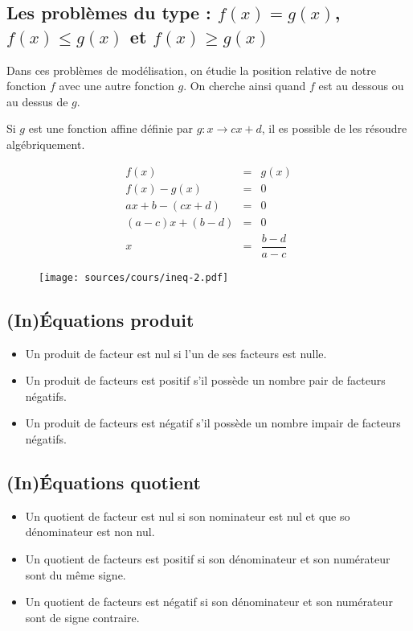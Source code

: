 \documentclass[paper=a4, fontsize=9pt]{scrartcl} %
\begin{document}
\subsection{Les problèmes du type : $f(x) = g(x)$, $f(x) \leq g(x)$ et $f(x) \geq g(x)$}

\begin{multicols}{2}

  Dans ces problèmes de modélisation, on étudie la position relative de notre fonction $f$ avec une autre fonction $g$. On cherche ainsi quand $f$ est au dessous ou au dessus de $g$.

  Si $g$ est une fonction affine définie par $ g : x \to cx + d$, il es possible de les résoudre algébriquement.


  \begin{eqnarray*}
    f(x) & = & g(x)\\
    f(x) - g(x) & = & 0\\
    ax + b - (cx + d) & = & 0\\
    (a - c) x + (b - d) &=& 0\\
    x &=& \dfrac{b-d}{a-c}
  \end{eqnarray*}

  \begin{figure}[H]
    \centering
    \texttt{[image: sources/cours/ineq-2.pdf]}
  \end{figure}

\end{multicols}

\subsection{(In)Équations produit}

\begin{Proposition}
  \begin{itemize}
  \item Un produit de facteur est nul si l'un de ses facteurs est nulle.
  \item Un produit de facteurs est positif s'il possède un nombre pair de facteurs négatifs. 
  \item Un produit de facteurs est négatif s'il possède un nombre impair de facteurs négatifs.
  \end{itemize} 
\end{Proposition}


\subsection{(In)Équations quotient}

\begin{Proposition}
  \begin{itemize}
  \item Un quotient de facteur est nul si son nominateur est nul et que so dénominateur est non nul.
  \item Un quotient de facteurs est positif si son dénominateur et son numérateur sont du même signe. 
  \item Un quotient de facteurs est négatif si son dénominateur et son numérateur sont de signe contraire.
  \end{itemize} 
\end{Proposition}
\end{document}
